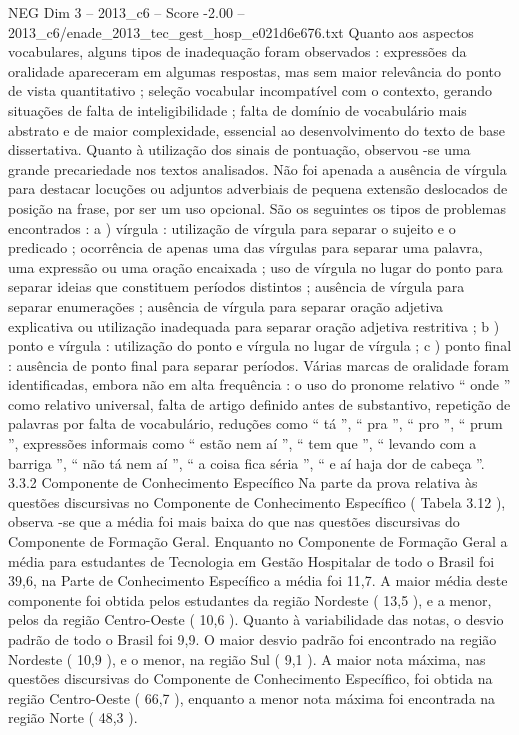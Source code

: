 \begin{textsample}{NEG Dim 3 – 2013\_c6 – Score -2.00 – 2013\_c6/enade\_2013\_tec\_gest\_hosp\_e021d6e676.txt}
Quanto aos aspectos vocabulares, alguns tipos de inadequação foram observados : expressões da oralidade apareceram em algumas respostas, mas sem maior relevância do ponto de vista quantitativo ; seleção vocabular incompatível com o contexto, gerando situações de falta de inteligibilidade ; falta de domínio de vocabulário mais abstrato e de maior complexidade, essencial ao desenvolvimento do texto de base dissertativa.
Quanto à utilização dos sinais de pontuação, observou -se uma grande precariedade nos textos analisados.
Não foi apenada a ausência de vírgula para destacar locuções ou adjuntos adverbiais de pequena extensão deslocados de posição na frase, por ser um uso opcional.
São os seguintes os tipos de problemas encontrados : a ) vírgula : utilização de vírgula para separar o sujeito e o predicado ; ocorrência de apenas uma das vírgulas para separar uma palavra, uma expressão ou uma oração encaixada ; uso de vírgula no lugar do ponto para separar ideias que constituem períodos distintos ; ausência de vírgula para separar enumerações ; ausência de vírgula para separar oração adjetiva explicativa ou utilização inadequada para separar oração adjetiva restritiva ; b ) ponto e vírgula : utilização do ponto e vírgula no lugar de vírgula ; c ) ponto final : ausência de ponto final para separar períodos.
Várias marcas de oralidade foram identificadas, embora não em alta frequência : o uso do pronome relativo “ onde ” como relativo universal, falta de artigo definido antes de substantivo, repetição de palavras por falta de vocabulário, reduções como “ tá ”, “ pra ”, “ pro ”, “ prum ”, expressões informais como “ estão nem aí ”, “ tem que ”, “ levando com a barriga ”, “ não tá nem aí ”, “ a coisa fica séria ”, “ e aí haja dor de cabeça ”. 3.3.2 Componente de Conhecimento Específico Na parte da prova relativa às questões discursivas no Componente de Conhecimento Específico ( Tabela 3.12 ), observa -se que a média foi mais baixa do que nas questões discursivas do Componente de Formação Geral.
Enquanto no Componente de Formação Geral a média para estudantes de Tecnologia em Gestão Hospitalar de todo o Brasil foi 39,6, na Parte de Conhecimento Específico a média foi 11,7.
A maior média deste componente foi obtida pelos estudantes da região Nordeste ( 13,5 ), e a menor, pelos da região Centro-Oeste ( 10,6 ).
Quanto à variabilidade das notas, o desvio padrão de todo o Brasil foi 9,9.
O maior desvio padrão foi encontrado na região Nordeste ( 10,9 ), e o menor, na região Sul ( 9,1 ).
A maior nota máxima, nas questões discursivas do Componente de Conhecimento Específico, foi obtida na região Centro-Oeste ( 66,7 ), enquanto a menor nota máxima foi encontrada na região Norte ( 48,3 ).

\end{textsample}
